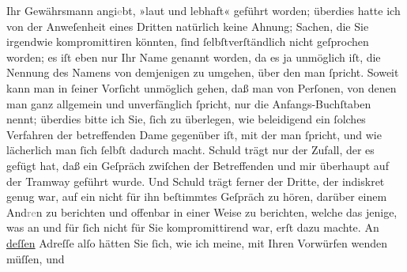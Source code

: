 {\begin{ledgroupsized}[t]{13cm}
               Ihr Gewährsmann
                  angi\textcolor{gray}{e}bt, »laut und lebhaft« geführt worden; überdies hatte ich
               von der Anweſenheit eines Dritten natürlich keine Ahnung; Sachen, die Sie irgendwie kompromittiren
               könnten, ſind ſelbſtverſtändlich nicht geſprochen worden; es iſt eben nur Ihr Name
               genannt worden, da es ja unmöglich iſt, die Nennung des Namens von demjenigen zu
               umgehen, über den man ſpricht. Soweit kann man in ſeiner Vorſicht unmöglich gehen,
               daß man von Perſonen, von denen man ganz {\pb}allgemein
               und unverfänglich ſpricht, nur die Anfangs-Buchſtaben nennt; überdies bitte ich Sie,
               ſich zu überlegen, wie beleidigend ein ſolches Verfahren der betreffenden Dame gegenüber iſt, mit der
               man ſpricht, und wie lächerlich man ſich ſelbſt dadurch macht. Schuld trägt nur der
               Zufall, der es gefügt hat, daß ein Geſpräch zwiſchen der Betreffenden und mir überhaupt auf der
               Tramway geführt wurde. Und Schuld trägt ferner der Dritte, der indiskret genug war, auf ein
               nicht für ihn beſtimmtes Geſpräch zu hören, darüber einem And\textcolor{gray}{re}n
               zu berichten und offenbar in einer Weise zu berichten, welche das jenige, was an  und für ſich nicht \introOben{}für Sie\introOben{}
               kompromittirend war, erſt dazu machte. An \uline{deſſen}
               Adreſſe alſo hätten Sie ſich, wie ich meine, mit Ihren Vorwürfen wenden müſſen, und

\end{ledgroupsized}}
